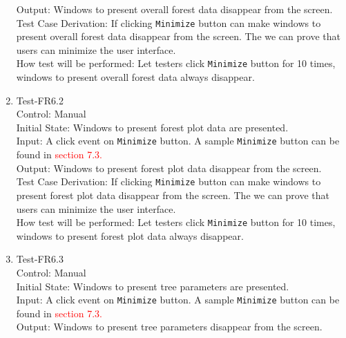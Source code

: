 \documentclass[12pt, titlepage]{article}
\begin{document}
\begin{enumerate}
Output: Windows to present overall forest data disappear from the screen.\\

Test Case Derivation: If clicking \verb|Minimize| button can make windows to present
overall forest data disappear from the screen. The we can prove that users can 
minimize the user interface.\\
					
How test will be performed:  Let testers click \verb|Minimize|
button for 10 times, windows to present overall forest data always disappear.

\item{Test-FR6.2\\}
Control: Manual\\ 

Initial State: Windows to present forest plot data are presented.\\

Input: A click event on \verb|Minimize| button. A sample \verb|Minimize| button
can be found in \textcolor{red}{section 7.3.}\\

Output: Windows to present forest plot data disappear from the screen.\\

Test Case Derivation: If clicking \verb|Minimize| button can make windows to present
forest plot data disappear from the screen. The we can prove that users can 
minimize the user interface.\\
					
How test will be performed:  Let testers click \verb|Minimize|
button for 10 times, windows to present forest plot data always disappear.


\item{Test-FR6.3\\}
Control: Manual\\ 

Initial State: Windows to present tree parameters are presented.\\

Input: A click event on \verb|Minimize| button. A sample \verb|Minimize| button
can be found in \textcolor{red}{section 7.3.}\\

Output: Windows to present tree parameters disappear from the screen.\\


\end{enumerate}
\end{document}
